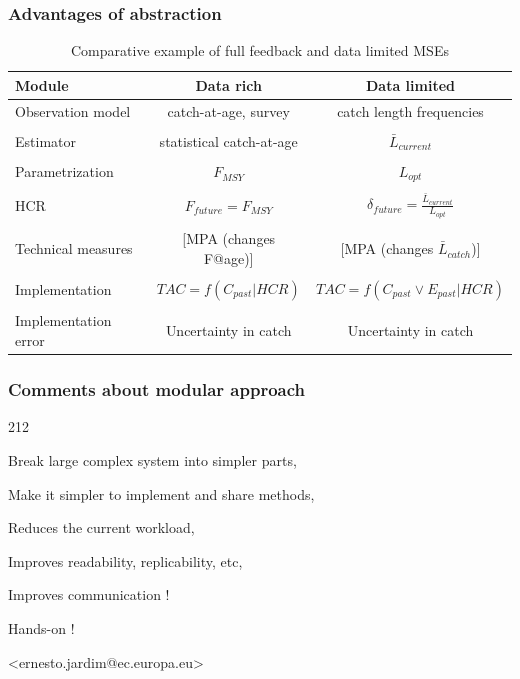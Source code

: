 \documentclass{beamer}\usepackage[]{graphicx}\usepackage[]{color}
\begin{document}
\begin{frame}
\frametitle{Advantages of abstraction}

\footnotesize

\begin{table}
	\begin{tabular}{l|c|c}
		\hline 
		Module	& Data rich & Data limited \\ 
		\hline 
		\hline 
		Observation model	&  catch-at-age, survey & catch length frequencies \\ 
    & & \\
		Estimator	& statistical catch-at-age &  $\bar{L}_{current}$ \\ 
    & & \\
		Parametrization	& $F_{MSY}$ &  $L_{opt}$ \\ 
    & & \\
		HCR	& $F_{future}=F_{MSY}$ & $\delta_{future}=\frac{\bar{L}_{current}}{L_{opt}}$ \\ 
    & & \\
		Technical measures	& [MPA (changes F@age)] & [MPA (changes $\bar{L}_{catch}$)] \\ 
    & & \\
		Implementation	& $TAC=f(C_{past}|HCR)$ & $TAC=f(C_{past} \lor E_{past}|HCR)$ \\ 
    & & \\
		Implementation error	& Uncertainty in catch & Uncertainty in catch \\ 
		\hline 
	\end{tabular} 
	
	\caption{Comparative example of full feedback and data limited MSEs}
\end{table}

\end{frame}

\begin{frame}
\frametitle{Comments about modular approach}

\Large

\begin{dinglist}{212}
  \item Break large complex system into simpler parts,
	\item Make it simpler to implement and share methods,
	\item Reduces the current workload,
	\item Improves readability, replicability, etc, 
	\item Improves communication !
\end{dinglist}

\end{frame}

\begin{frame}
	
\Huge \centering Hands-on !

\vfill
	
\normalsize \centering <ernesto.jardim@ec.europa.eu>
	
\end{frame}
\end{document}
